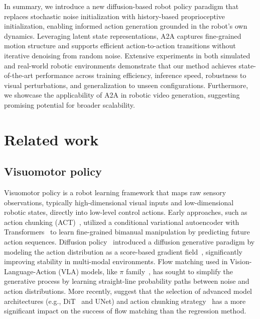 \documentclass[onecolumn]{fairmeta}
\newcommand{\m}[1]{{A2A}}
\begin{document}
In summary, we introduce a new diffusion-based robot policy paradigm that replaces stochastic noise initialization with history-based proprioceptive initialization, enabling informed action generation grounded in the robot’s own dynamics. Leveraging latent state representations, \m{} captures fine-grained motion structure and supports efficient action-to-action transitions without iterative denoising from random noise. Extensive experiments in both simulated and real-world robotic environments demonstrate that our method achieves state-of-the-art performance across training efficiency, inference speed, robustness to visual perturbations, and generalization to unseen configurations. Furthermore, we showcase the applicability of \m{} in robotic video generation, suggesting promising potential for broader scalability.
	\section{Related work}

\subsection{Visuomotor policy}
Visuomotor policy is a robot learning framework that maps raw sensory observations, typically high-dimensional visual inputs and low-dimensional robotic states, directly into low-level control actions. Early approaches, such as action chunking (ACT)~\citep{zhao2023learning}, utilized a conditional variational autoencoder with Transformers~\citep{vaswani2017attention} to learn fine-grained bimanual manipulation by predicting future action sequences. Diffusion policy~\citep{dp} introduced a diffusion generative paradigm by modeling the action distribution as a score-based gradient field~\citep{ddpm, song2020score}, significantly improving stability in multi-modal environments. Flow matching \citep{flowmatching} used in Vision-Language-Action (VLA) models, like $\pi$ family~\citep{intelligence2025pi,intelligence2025pi05, black2024pi_0}, has sought to simplify the generative process by learning straight-line probability paths between noise and action distributions. More recently, \citet{pan2025much} suggest that the selection of advanced model architectures (e.g., DiT~\citep{Peebles_2023_ICCV} and UNet\citep{dp}) and action chunking strategy~\citep{zhao2023learning} has a more significant impact on the success of flow matching than the regression method.
\end{document}
